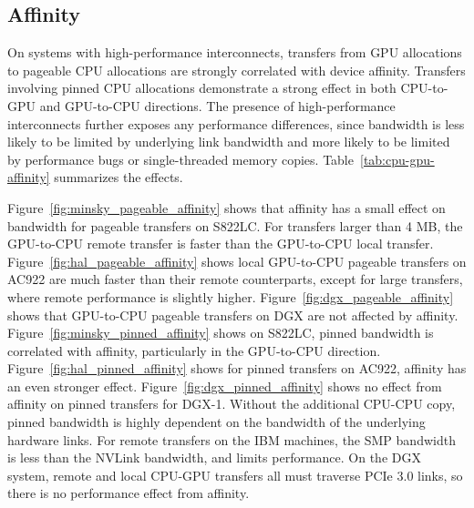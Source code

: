 \subsection{Affinity}
\label{sec:explicit-cpu-gpu-affinity}

On systems with high-performance interconnects, transfers from GPU allocations to pageable CPU allocations are strongly correlated with device affinity.
Transfers involving pinned CPU allocations demonstrate a strong effect in both CPU-to-GPU and GPU-to-CPU directions.
The presence of high-performance interconnects further exposes any performance differences, since bandwidth is less likely to be limited by underlying link bandwidth and more likely to be limited by performance bugs or single-threaded memory copies.
Table~\ref{tab:cpu-gpu-affinity} summarizes the effects.

Figure~\ref{fig:minsky_pageable_affinity} shows that affinity has a small effect on bandwidth for pageable transfers on S822LC.
For transfers larger than 4 MB, the GPU-to-CPU remote transfer is faster than the GPU-to-CPU local transfer.
Figure~\ref{fig:hal_pageable_affinity} shows local GPU-to-CPU pageable transfers on AC922 are much faster than their remote counterparts, except for large transfers, where remote performance is slightly higher.
Figure~\ref{fig:dgx_pageable_affinity} shows that GPU-to-CPU pageable transfers on DGX are not affected by affinity.
Figure~\ref{fig:minsky_pinned_affinity} shows on S822LC, pinned bandwidth is correlated with affinity, particularly in the GPU-to-CPU direction.
Figure~\ref{fig:hal_pinned_affinity} shows for pinned transfers on AC922, affinity has an even stronger effect.
Figure~\ref{fig:dgx_pinned_affinity} shows no effect from affinity on pinned transfers for DGX-1.
Without the additional CPU-CPU copy, pinned bandwidth is highly dependent on the bandwidth of the underlying hardware links.
For remote transfers on the IBM machines, the SMP bandwidth is less than the NVLink bandwidth, and limits performance.
On the DGX system, remote and local CPU-GPU transfers all must traverse PCIe 3.0 links, so there is no performance effect from affinity.

